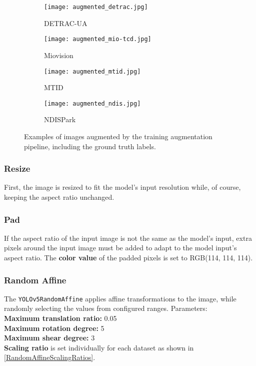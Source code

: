 \begin{figure}[t]
    \centering
    \begin{subfigure}[b]{0.49\textwidth}
        \texttt{[image: augmented\_detrac.jpg]}
        \caption{DETRAC-UA}
    \end{subfigure}
    \begin{subfigure}[b]{0.49\textwidth}
        \texttt{[image: augmented\_mio-tcd.jpg]}
        \caption{Miovision}
    \end{subfigure}
    \begin{subfigure}[b]{0.49\textwidth}
        \texttt{[image: augmented\_mtid.jpg]}
        \caption{MTID}
    \end{subfigure}
    \begin{subfigure}[b]{0.49\textwidth}
        \texttt{[image: augmented\_ndis.jpg]}
        \caption{NDISPark}
    \end{subfigure}
    \caption{Examples of images augmented by the training augmentation pipeline,
    including the ground truth labels.}
    \label{AugmentedExamples}
\end{figure}


\subsubsection*{Resize}

First, the image is resized to fit the model's input resolution while, of
course, keeping the aspect ratio unchanged.

\subsubsection*{Pad}

If the aspect ratio of the input image is not the same as the model's input, extra pixels around the input image must be added
to adapt to the model input's aspect ratio. The \textbf{color value} of the padded pixels is set to RGB(114, 114, 114).

\subsubsection*{Random Affine}

The \texttt{YOLOv5RandomAffine} applies affine transformations to the image,
while randomly selecting the values from configured ranges. Parameters:\\
\textbf{Maximum translation ratio:} 0.05 \\
\textbf{Maximum rotation degree:} 5 \\
\textbf{Maximum shear degree:} 3 \\
\textbf{Scaling ratio} is set individually for each dataset as shown in \autoref{RandomAffineScalingRatios}.

